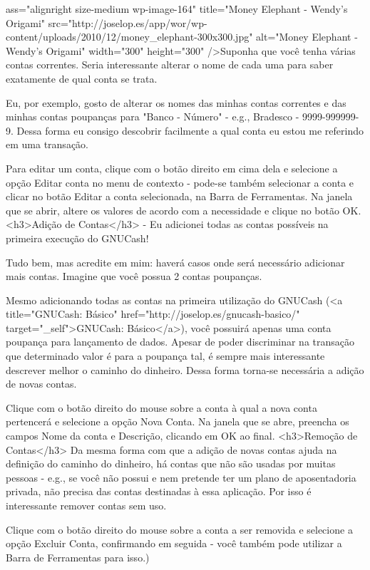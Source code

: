 ass="alignright size-medium wp-image-164" title="Money Elephant - Wendy's Origami" src="http://joselop.es/app/wor/wp-content/uploads/2010/12/money_elephant-300x300.jpg" alt="Money Elephant - Wendy's Origami" width="300" height="300" />Suponha que você tenha várias contas correntes. Seria interessante alterar o nome de cada uma para saber exatamente de qual conta se trata.

Eu, por exemplo, gosto de alterar os nomes das minhas contas correntes e das minhas contas poupanças para "Banco - Número" - e.g., Bradesco - 9999-999999-9. Dessa forma eu consigo descobrir facilmente a qual conta eu estou me referindo em uma transação.

Para editar um conta, clique com o botão direito em cima dela e selecione a opção Editar conta no menu de contexto - pode-se também selecionar a conta e clicar no botão Editar a conta selecionada, na Barra de Ferramentas. Na janela que se abrir, altere os valores de acordo com a necessidade e clique no botão OK.
<h3>Adição de Contas</h3>
- Eu adicionei todas as contas possíveis na primeira execução do GNUCash!

Tudo bem, mas acredite em mim: haverá casos onde será necessário adicionar mais contas. Imagine que você possua 2 contas poupanças.

Mesmo adicionando todas as contas na primeira utilização do GNUCash (<a title="GNUCash: Básico" href="http://joselop.es/gnucash-basico/" target="_self">GNUCash: Básico</a>), você possuirá apenas uma conta poupança para lançamento de dados. Apesar de poder discriminar na transação que determinado valor é para a poupança tal, é sempre mais interessante descrever melhor o caminho do dinheiro. Dessa forma torna-se necessária a adição de novas contas.

Clique com o botão direito do mouse sobre a conta à qual a nova conta pertencerá e selecione a opção Nova Conta. Na janela que se abre, preencha os campos Nome da conta e Descrição, clicando em OK ao final.
<h3>Remoção de Contas</h3>
Da mesma forma com que a adição de novas contas ajuda na definição do caminho do dinheiro, há contas que não são usadas por muitas pessoas - e.g., se você não possui e nem pretende ter um plano de aposentadoria privada, não precisa das contas destinadas à essa aplicação. Por isso é interessante remover contas sem uso.

Clique com o botão direito do mouse sobre a conta a ser removida e selecione a opção Excluir Conta, confirmando em seguida - você também pode utilizar a Barra de Ferramentas para isso.)
